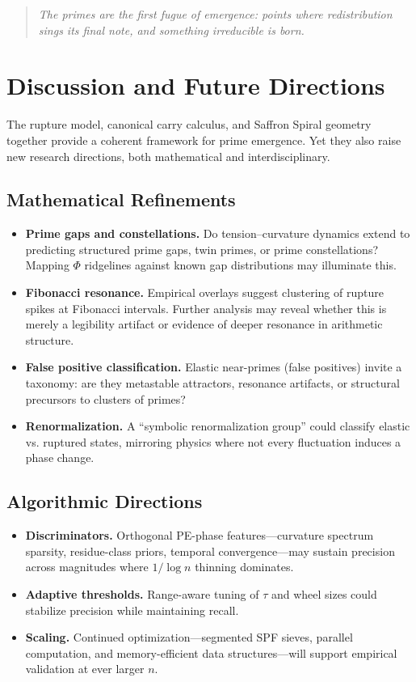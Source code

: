 \documentclass[11pt]{article}
\theoremstyle{plain}
\theoremstyle{definition}
\begin{document}
\begin{quote}
\emph{The primes are the first fugue of emergence:  
points where redistribution sings its final note,  
and something irreducible is born.}
\end{quote}

\section{Discussion and Future Directions}

The rupture model, canonical carry calculus, and Saffron Spiral geometry together provide a coherent framework for prime emergence. Yet they also raise new research directions, both mathematical and interdisciplinary.

\subsection{Mathematical Refinements}
\begin{itemize}
  \item \textbf{Prime gaps and constellations.} Do tension–curvature dynamics extend to predicting structured prime gaps, twin primes, or prime constellations? Mapping $\Phi$ ridgelines against known gap distributions may illuminate this.
  \item \textbf{Fibonacci resonance.} Empirical overlays suggest clustering of rupture spikes at Fibonacci intervals. Further analysis may reveal whether this is merely a legibility artifact or evidence of deeper resonance in arithmetic structure.
  \item \textbf{False positive classification.} Elastic near-primes (false positives) invite a taxonomy: are they metastable attractors, resonance artifacts, or structural precursors to clusters of primes?
  \item \textbf{Renormalization.} A “symbolic renormalization group” could classify elastic vs. ruptured states, mirroring physics where not every fluctuation induces a phase change.
\end{itemize}

\subsection{Algorithmic Directions}
\begin{itemize}
  \item \textbf{Discriminators.} Orthogonal PE-phase features—curvature spectrum sparsity, residue-class priors, temporal convergence—may sustain precision across magnitudes where $1/\log n$ thinning dominates.
  \item \textbf{Adaptive thresholds.} Range-aware tuning of $\tau$ and wheel sizes could stabilize precision while maintaining recall.  
  \item \textbf{Scaling.} Continued optimization—segmented SPF sieves, parallel computation, and memory-efficient data structures—will support empirical validation at ever larger $n$.
\end{itemize}
\end{document}
